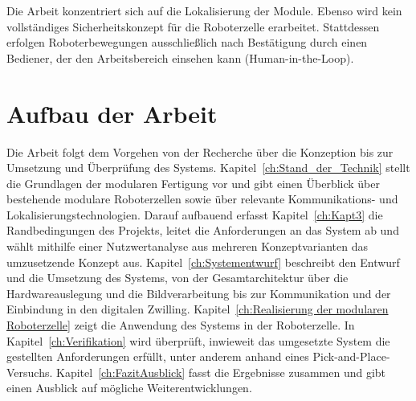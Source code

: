 Die Arbeit konzentriert sich auf die Lokalisierung der Module.
Ebenso wird kein vollständiges Sicherheitskonzept für die Roboterzelle erarbeitet. Stattdessen erfolgen Roboterbewegungen ausschließlich nach Bestätigung durch einen Bediener, der den Arbeitsbereich einsehen kann (Human-in-the-Loop).

\section{Aufbau der Arbeit}
\label{sec:Aufbau}

Die Arbeit folgt dem Vorgehen von der Recherche über die Konzeption bis zur Umsetzung und Überprüfung des Systems. Kapitel~\ref{ch:Stand_der_Technik} stellt die Grundlagen der modularen Fertigung vor und gibt einen Überblick über bestehende modulare Roboterzellen sowie über relevante Kommunikations- und Lokalisierungstechnologien. Darauf aufbauend erfasst Kapitel~\ref{ch:Kapt3} die Randbedingungen des Projekts, leitet die Anforderungen an das System ab und wählt mithilfe einer Nutzwertanalyse aus mehreren Konzeptvarianten das umzusetzende Konzept aus. Kapitel~\ref{ch:Systementwurf} beschreibt den Entwurf und die Umsetzung des Systems, von der Gesamtarchitektur über die Hardwareauslegung und die Bildverarbeitung bis zur Kommunikation und der Einbindung in den digitalen Zwilling. Kapitel~\ref{ch:Realisierung der modularen Roboterzelle} zeigt die Anwendung des Systems in der Roboterzelle. In Kapitel~\ref{ch:Verifikation} wird überprüft, inwieweit das umgesetzte System die gestellten Anforderungen erfüllt, unter anderem anhand eines Pick-and-Place-Versuchs. Kapitel~\ref{ch:FazitAusblick} fasst die Ergebnisse zusammen und gibt einen Ausblick auf mögliche Weiterentwicklungen.